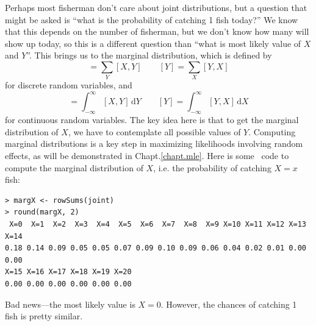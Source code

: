 Perhaps most fisherman don't care about joint distributions, but a
question that might be asked is ``what is the probability
of catching 1 fish today?'' We know that this depends on the
number of fisherman, but we don't know how many will show up
today, so this is a different question than ``what is most likely
value of $X$ and $Y$''. This brings us to the marginal distribution, which is defined by
\begin{equation*}
  [X] = \sum_Y [X,Y] \qquad
  [Y] = \sum_X [Y,X]
\end{equation*}
for discrete random variables, and
\begin{equation*}
  [X] = \int_{-\infty}^\infty [X,Y] \, \mathrm{d}Y \qquad
  [Y] = \int_{-\infty}^\infty [Y,X] \, \mathrm{d}X
\end{equation*}
for continuous random variables. The key idea here is that to get the
marginal distribution of $X$, we have to contemplate all possible
values of $Y$. Computing marginal distributions is a key step in
maximizing likelihoods involving random effects, as will be
demonstrated in Chapt.\ref{chapt.mle}. Here is some \R~code to compute
the marginal distribution of $X$, i.e. the probability of catching
$X=x$ fish:
\begin{verbatim}
> margX <- rowSums(joint)
> round(margX, 2)
 X=0  X=1  X=2  X=3  X=4  X=5  X=6  X=7  X=8  X=9 X=10 X=11 X=12 X=13 X=14
0.18 0.14 0.09 0.05 0.05 0.07 0.09 0.10 0.09 0.06 0.04 0.02 0.01 0.00 0.00
X=15 X=16 X=17 X=18 X=19 X=20
0.00 0.00 0.00 0.00 0.00 0.00
\end{verbatim}
Bad news---the most likely value is $X=0$. However, the chances of
catching 1 fish is pretty similar.

